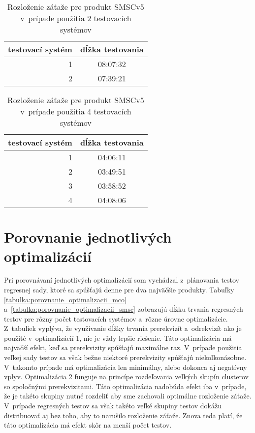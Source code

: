 \begin{table}[h!]
  \begin{center}
    \begin{tabular}{ | r | c | }
      \hline
      testovací systém & dĺžka testovania \\ \hline
      1  & 08:07:32  \\ \hline
      2  & 07:39:21  \\ \hline 
    \end{tabular}
    \caption{Rozloženie záťaže pre produkt SMSCv5 v~prípade použitia 2 
             testovacích systémov}
    \label{tabulka:rozlozenie_zataze_smsc_2}
  \end{center}
\end{table}

\begin{table}[h!]
  \begin{center}
    \begin{tabular}{ | r | c | }
      \hline
      testovací systém & dĺžka testovania \\ \hline
      1  & 04:06:11  \\ \hline
      2  & 03:49:51  \\ \hline 
      3  & 03:58:52  \\ \hline 
      4  & 04:08:06  \\ \hline
    \end{tabular}
    \caption{Rozloženie záťaže pre produkt SMSCv5 v~prípade použitia 4 
             testovacích systémov}
    \label{tabulka:rozlozenie_zataze_smsc_4}
  \end{center}
\end{table}


\section{Porovnanie jednotlivých optimalizácií}
\label{sekcia:porovnanie_optimalizacii}
Pri porovnávaní jednotlivých optimalizácií som vychádzal z~plánovania testov
regresnej sady, ktoré sa spúšťajú denne pre dva najväčšie produkty. 
Tabuľky \ref{tabulka:porovnanie_optimalizacii_mco}
a~\ref{tabulka:porovnanie_optimalizacii_smsc} zobrazujú dĺžku trvania
regresných testov pre rôzny počet testovacích systémov a~rôzne úrovne
optimalizácie. Z~tabuliek vyplýva, že využívanie dĺžky trvania prerekvizít
a~odrekvizít ako je použité v~optimalizácií 1, nie je vždy lepšie riešenie.
Táto optimalizácia má najväčší efekt, keď sa prerekvizity spúšťajú maximálne
raz. V~prípade použitia veľkej sady testov sa však bežne niektoré prerekvizity
spúšťajú niekoľkonásobne. V~takomto prípade má optimalizácia len minimálny,
alebo dokonca aj negatívny vplyv. Optimalizácia 2 funguje na princípe rozdeľovania
veľkých skupín clusterov so spoločnými prerekvizitami. Táto optimalizácia
nadobúda efekt iba v~prípade, že je takéto skupiny nutné rozdeliť aby sme 
zachovali optimálne rozloženie záťaže. V~prípade regresných testov sa však 
takéto veľké skupiny testov dokážu distribuovať aj bez toho, aby to narušilo
rozloženie záťaže. Znova teda platí, že táto optimalizácia má efekt skôr na
menší počet testov. 


